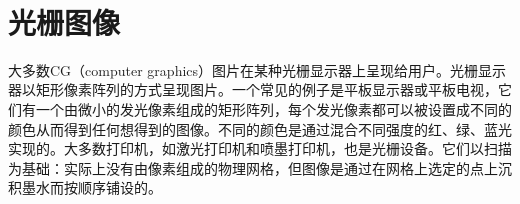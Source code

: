 \documentclass[lang=cn,12pt,marginpar=margintrue]{elegantbook}
\begin{document}
\begin{lstlisting}
  
\end{lstlisting}
















































\chapter{光栅图像}

大多数CG（computer graphics）图片在某种光栅显示器上呈现给用户。光栅显示器以矩形像素阵列的方式呈现图片。一个常见的例子是平板显示器或平板电视，它们有一个由微小的发光像素组成的矩形阵列，每个发光像素都可以被设置成不同的颜色从而得到任何想得到的图像。不同的颜色是通过混合不同强度的红、绿、蓝光实现的。大多数打印机，如激光打印机和喷墨打印机，也是光栅设备。它们以扫描为基础：实际上没有由像素组成的物理网格，但图像是通过在网格上选定的点上沉积墨水而按顺序铺设的。


\end{document}
